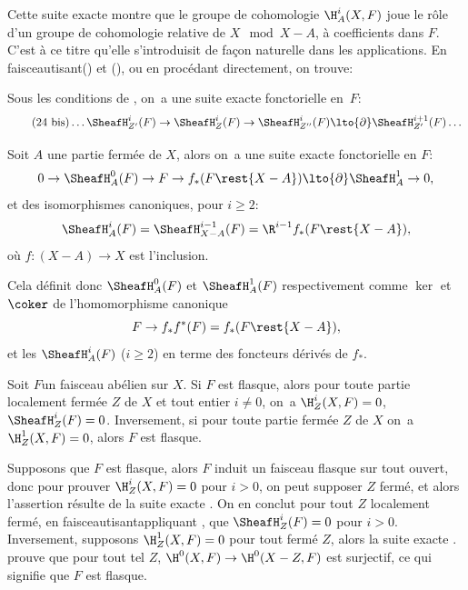 Cette suite exacte montre que le groupe de cohomologie $\H^i_A(X,
F)$ joue le r\^{o}le d'un groupe de cohomologie relative de $X\mod
X-A$, \`a coefficients dans $F$. C'est \`a ce titre qu'elle
s'introduisit de fa\c con naturelle dans les applications. En \og
faisceautisant\fg () et (), ou en
proc\'edant directement, on trouve:

\begin{corollaire} \label{I.2.10}
Sous les conditions de , on~a une suite exacte fonctorielle en~$F$:
\begin{equation*} \label{eq:I.24bis} \tag{24 bis}
\dots \SheafH^i_{Z'}(F) \to \SheafH^i_{Z}(F) \to \SheafH_{Z''}^i(F) \lto{\partial} \SheafH_{Z'}^{i+1}(F) \dots
\end{equation*}
\end{corollaire}

\begin{corollaire} \label{I.2.11}
Soit $A$ une partie ferm\'ee de $X$, alors on~a une suite exacte fonctorielle en $F$:
\begin{equation} \label{eq:I.28}
0 \to \SheafH_A^0(F) \to F \to f_*(F\rest{X-A}) \lto{\partial} \SheafH_A^1 \to 0,
\end{equation}
et des isomorphismes canoniques, pour $i\geq 2$:
\begin{equation} \label{eq:I.29}
\SheafH_A^i(F)= \SheafH_{X-A}^{i-1}(F)=\R^{i-1}f_*(F\rest{X-A}),
\end{equation}
o\`u $f: (X-A) \to X$ est l'inclusion.
\end{corollaire}

Cela d\'efinit donc $\SheafH^0_A(F)$ et $\SheafH_A^1(F)$ respectivement comme $\ker$ et $\coker$ de l'homomorphisme canonique
$$F \to f_*f^*(F)= f_*(F\rest{X-A}),
$$
et les $\SheafH_A^i(F)$ ($i\geq 2$) en terme des foncteurs d\'eriv\'es de $f_*$.

\begin{corollaire} \label{I.2.12}
Soit $F$\pageoriginale un faisceau ab\'elien sur $X$. Si $F$ est flasque, alors pour toute partie localement ferm\'ee $Z$ de $X$ et tout entier $i\neq 0$, on~a $\H^i_Z(X, F)=0$, $\SheafH^i_Z(F)=0$. Inversement, si pour toute partie ferm\'ee $Z$ de $X$ on~a $\H_Z^1(X, F)=0$, alors $F$ est flasque.
\end{corollaire}

Supposons que $F$ est flasque, alors $F$ induit un faisceau flasque sur tout ouvert, donc pour prouver $\H^i_Z(X, F)=0$ pour $i>0$, on peut supposer $Z$ ferm\'e, et alors l'assertion r\'esulte de la suite exacte . On en conclut pour tout $Z$ localement ferm\'e, en \og faisceautisant\fg \ie appliquant , que $\SheafH^i_Z(F)=0$ pour $i>0$. Inversement, supposons $\H^1_Z(X, F)=0$ pour tout ferm\'e $Z$, alors la suite exacte . prouve que pour tout tel $Z$, $\H^0(X, F) \to \H^0(X-Z, F)$ est surjectif, ce qui signifie que $F$ est flasque.


